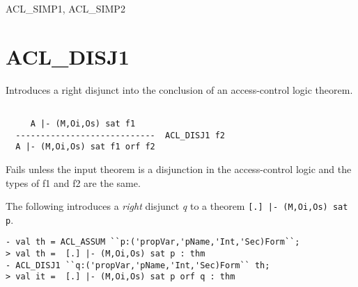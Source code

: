\SEEALSO
ACL\_SIMP1, ACL\_SIMP2
\ENDDOC

\section{ACL\_DISJ1}





\egroup

\SYNOPSIS
Introduces a right disjunct into the conclusion of an access-control
logic theorem.

\DESCRIBE
\begin{verbatim}

     A |- (M,Oi,Os) sat f1
  ----------------------------  ACL_DISJ1 f2
  A |- (M,Oi,Os) sat f1 orf f2
\end{verbatim}

\FAILURE
Fails unless the input theorem is a disjunction in the
access-control logic and the types of f1 and f2 are the same.

\EXAMPLE 
The following introduces a \emph{right} disjunct \emph{q} to
a theorem \texttt{[.] |- (M,Oi,Os) sat p}.
\begin{holboxed}
\begin{verbatim}
- val th = ACL_ASSUM ``p:('propVar,'pName,'Int,'Sec)Form``;
> val th =  [.] |- (M,Oi,Os) sat p : thm
- ACL_DISJ1 ``q:('propVar,'pName,'Int,'Sec)Form`` th;
> val it =  [.] |- (M,Oi,Os) sat p orf q : thm
\end{verbatim}
\end{holboxed}

